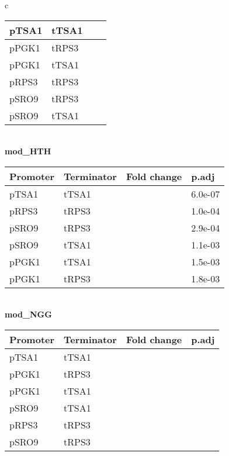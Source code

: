 \documentclass[../main.tex]{subfiles}
\begin{document}
\begin{table}[ph!]
{\begin{tabular}{ c }
\begin{tabularx}{0.8\textwidth} { 
  | >{\centering\arraybackslash}X 
  | >{\centering\arraybackslash}X  
  | >{\centering\arraybackslash}X
  | >{\centering\arraybackslash}X | }
\hline
pTSA1 & tTSA1 & 0.6247665 & 0.0029\\
\hline
pPGK1 & tRPS3 & 0.6645988 & 0.0150\\
\hline
pPGK1 & tTSA1 & 0.6954945 & 0.0150\\
\hline
pRPS3 & tRPS3 & 0.7238204 & 0.0210\\
\hline
pSRO9 & tRPS3 & 0.8151770 & 0.0240\\
\hline
pSRO9 & tTSA1 & 0.8734047 & 0.4000\\
\hline
\end{tabularx} \\
\textbf{mod\_HTH} \\
\begin{tabularx}{0.8\textwidth} { 
  | >{\centering\arraybackslash}X 
  | >{\centering\arraybackslash}X  
  | >{\centering\arraybackslash}X
  | >{\centering\arraybackslash}X | }
\hline
\textbf{Promoter} & \textbf{Terminator} & \textbf{Fold change} & \textbf{p.adj}\\
\hline
pTSA1 & tTSA1 & 0.2786772 & 6.0e-07\\
\hline
pRPS3 & tRPS3 & 0.3352986 & 1.0e-04\\
\hline
pSRO9 & tRPS3 & 0.4865148 & 2.9e-04\\
\hline
pSRO9 & tTSA1 & 0.4909374 & 1.1e-03\\
\hline
pPGK1 & tTSA1 & 0.5889067 & 1.5e-03\\
\hline
pPGK1 & tRPS3 & 0.5891336 & 1.8e-03\\
\hline
\end{tabularx} \\
\textbf{mod\_NGG} \\
\begin{tabularx}{0.8\textwidth} { 
  | >{\centering\arraybackslash}X 
  | >{\centering\arraybackslash}X  
  | >{\centering\arraybackslash}X
  | >{\centering\arraybackslash}X | }
\hline
\textbf{Promoter} & \textbf{Terminator} & \textbf{Fold change} & \textbf{p.adj}\\
\hline
pTSA1 & tTSA1 & 0.8299585 & 0.1100\\
\hline
pPGK1 & tRPS3 & 1.0221923 & 0.8500\\
\hline
pPGK1 & tTSA1 & 1.0470925 & 0.8100\\
\hline
pSRO9 & tTSA1 & 1.1112799 & 0.3700\\
\hline
pRPS3 & tRPS3 & 1.1957891 & 0.2700\\
\hline
pSRO9 & tRPS3 & 1.5013874 & 0.0017\\
\hline
\end{tabularx} \\

\end{tabular}}
\end{table}
\end{document}
